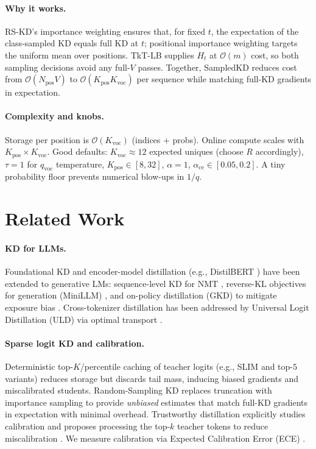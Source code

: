 \documentclass[11pt]{article}
\begin{document}
\paragraph{Why it works.}
RS-KD's importance weighting ensures that, for fixed $t$, the expectation of the class-sampled KD equals full KD at $t$; positional importance weighting targets the uniform mean over positions.
TkT-LB supplies $H_t$ at $\mathcal{O}(m)$ cost, so both sampling decisions avoid any full-$V$ passes.
Together, SampledKD reduces cost from $\mathcal{O}(N_{\text{pos}}V)$ to $\mathcal{O}(K_{\text{pos}}K_{\text{voc}})$ per sequence while matching full-KD gradients in expectation.

\paragraph{Complexity and knobs.}
Storage per position is $\mathcal{O}(K_{\text{voc}})$ (indices $+$ probs). Online compute scales with $K_{\text{pos}}\!\times\!K_{\text{voc}}$. Good defaults:
$K_{\text{voc}}\!\approx\!12$ expected uniques (choose $R$ accordingly),
$\tau{=}1$ for $q_{\text{voc}}$ temperature,
$K_{\text{pos}}\!\in\![8,32]$,
$\alpha{=}1$,
$\alpha_{\text{ce}}\!\in\![0.05,0.2]$.
A tiny probability floor prevents numerical blow-ups in $1/q$.


\section{Related Work}

\paragraph{KD for LLMs.} Foundational KD \citep{hinton2015distillation} and encoder-model distillation (e.g., DistilBERT \citep{sanh2019distilbert}) have been extended to generative LMs: sequence-level KD for NMT \citep{kim2016sequencekd}, reverse-KL objectives for generation (MiniLLM) \citep{gu2023minillm}, and on-policy distillation (GKD) to mitigate exposure bias \citep{agarwal2024gkd}. Cross-tokenizer distillation has been addressed by Universal Logit Distillation (ULD) via optimal transport \citep{boizard2024uld}.

\paragraph{Sparse logit KD and calibration.} Deterministic top-$K$/percentile caching of teacher logits (e.g., SLIM \citep{raman2023slim} and top-$5$ variants) reduces storage but discards tail mass, inducing biased gradients and miscalibrated students. Random-Sampling KD \citep{anshumann2025sparse} replaces truncation with importance sampling to provide \emph{unbiased} estimates that match full-KD gradients in expectation with minimal overhead. Trustworthy distillation explicitly studies calibration and proposes processing the top-$k$ teacher tokens to reduce miscalibration \citep{shum2024first}. We measure calibration via Expected Calibration Error (ECE) \citep{guo2017calibration}.
\end{document}
